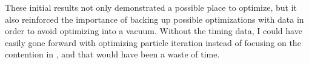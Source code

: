 These initial results not only demonstrated a possible place to optimize, but it also reinforced the importance of backing up possible optimizations with data in order to avoid optimizing into a vacuum. Without the timing data, I could have easily gone forward with optimizing particle iteration instead of focusing on the contention in , and that would have been a waste of time.


